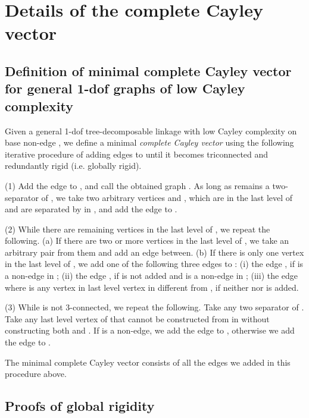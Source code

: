 \documentclass[secthm,amsthm,english]{article}
\theoremstyle{definition}
\theoremstyle{remark}
\begin{document}
\section{Details of the complete Cayley vector}
\label{app:cayley_vector}

\subsection{Definition of minimal complete Cayley vector for general 1-dof graphs of low Cayley complexity}

Given a general 1-dof tree-decomposable linkage  with low Cayley complexity on base non-edge ,
we define a minimal \emph{complete Cayley vector}  using the following iterative procedure
of adding edges to  until it becomes triconnected and redundantly rigid (i.e. globally rigid).

\noindent (1) 
Add the edge  to , and call the obtained graph . 
As long as  remains a two-separator of , 
we take two arbitrary vertices  and ,
which are in the last level of  and are separated by  in , 
and add the edge  to . 

\noindent (2) While there are remaining vertices in the last level of , we repeat the following.
(a) If there are two or more vertices in the last level of , we take an arbitrary pair from them and add an edge between.
(b) If there is only one vertex  in the last level of , 
we add one of the following three edges to : 
(i) the edge , if  is a non-edge in ; 
(ii) the edge , if  is not added and  is a non-edge in ;
(iii) the edge  where  is any vertex in last level vertex in  different from , if neither  nor  is added.

\noindent (3) While  is not 3-connected, we repeat the following. 
Take any two separator  of . 
Take any last level vertex  of  that cannot be constructed from  in  without constructing both  and . 
If  is a non-edge, we add the edge  to , otherwise we add the edge  to . 

The minimal complete Cayley vector  consists of all the edges we added in this procedure above. 


\subsection{Proofs of global rigidity}
\end{document}
